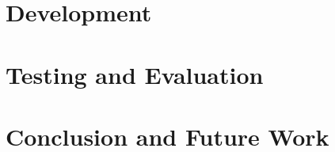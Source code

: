 \documentclass[titlepage,a4paper,11pt,oneside]{book} %
\begin{document}
\chapter{Development}
\label{sec:dev}


\chapter{Testing and Evaluation}
\label{sec:test}


\chapter{Conclusion and Future Work}
\label{sec:conc}


\pagebreak
\renewcommand{\bibname}{References}

\end{document}
